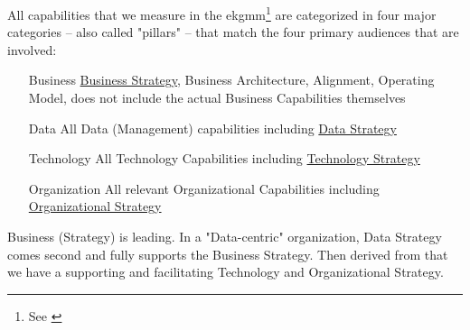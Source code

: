 All capabilities that we measure in the \gls{ekgmm}\footnote{See \cite{ekgmm}} are categorized
in four major categories -- also called "pillars" -- that match the four primary audiences that are involved:

\begin{enumerate}[leftmargin=1in,font=\bfseries]
    \item [Business]     \ul{Business Strategy}, Business Architecture, Alignment, Operating Model,
                         does not include the actual Business Capabilities themselves
    \item [Data]         All Data (Management) capabilities including \ul{Data Strategy}
    \item [Technology]   All Technology Capabilities including \ul{Technology Strategy}
    \item [Organization] All relevant Organizational Capabilities including \ul{Organizational Strategy}
\end{enumerate}

Business (Strategy) is leading.
In a "Data-centric" organization, Data Strategy comes second and fully supports the Business Strategy.
Then derived from that we have a supporting and facilitating Technology and Organizational Strategy.
